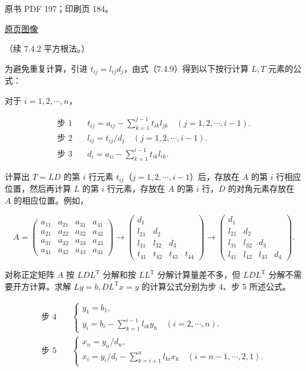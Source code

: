 \documentclass[
  10pt,
  fontset=fandol]{ctexart}
\begin{document}
\clearpage

原书 PDF 197；印刷页 184。

\href{../../../source-images/pdf-197.jpeg}{原页图像}

（续 7.4.2 平方根法。）

为避免重复计算，引进 \(t_{ij}=l_{ij}d_j\)，由式（7.4.9）得到以下按行计算
\(L,T\) 元素的公式：

对于 \(i=1,2,\cdots,n\)，

\[
\begin{aligned}
\text{步 1}\quad &t_{ij}=a_{ij}-\sum_{k=1}^{j-1}t_{ik}l_{jk}\quad(j=1,2,\cdots,i-1).\\
\text{步 2}\quad &l_{ij}=t_{ij}/d_j\quad(j=1,2,\cdots,i-1).\\
\text{步 3}\quad &d_i=a_{ii}-\sum_{k=1}^{i-1}t_{ik}l_{ik}.
\end{aligned}
\tag{7.4.10}
\]

计算出 \(T=LD\) 的第 \(i\) 行元素
\(t_{ij}\)（\(j=1,2,\cdots,i-1\)）后，存放在 \(A\) 的第 \(i\)
行相应位置，然后再计算 \(L\) 的第 \(i\) 行元素，存放在 \(A\) 的第 \(i\)
行，\(D\) 的对角元素存放在 \(A\) 的相应位置。例如，

\[
A=\begin{pmatrix}
a_{11}&a_{21}&a_{31}&a_{41}\\
a_{21}&a_{22}&a_{32}&a_{42}\\
a_{31}&a_{32}&a_{33}&a_{43}\\
a_{41}&a_{42}&a_{43}&a_{44}
\end{pmatrix}
\longrightarrow
\begin{pmatrix}
d_1&&&\\
l_{21}&d_2&&\\
l_{31}&l_{32}&d_3&\\
t_{41}&t_{42}&t_{43}&t_{44}
\end{pmatrix}
\longrightarrow
\begin{pmatrix}
d_1&&&\\
l_{21}&d_2&&\\
l_{31}&l_{32}&d_3&\\
l_{41}&l_{42}&l_{43}&d_4
\end{pmatrix}.
\]

对称正定矩阵 \(A\) 按 \(LDL^{\mathrm T}\) 分解和按 \(LL^{\mathrm T}\)
分解计算量差不多，但 \(LDL^{\mathrm T}\) 分解不需要开方计算。求解
\(Ly=b,DL^{\mathrm T}x=y\) 的计算公式分别为步 4、步 5 所述公式。

\[
\begin{aligned}
\text{步 4}\quad &\begin{cases}
y_1=b_1,\\
y_i=b_i-\displaystyle\sum_{k=1}^{i-1}l_{ik}y_h\quad(i=2,\cdots,n).
\end{cases}\\
\text{步 5}\quad &\begin{cases}
x_n=y_n/d_n,\\
x_i=y_i/d_i-\displaystyle\sum_{k=i+1}^{n}l_{ki}x_k\quad(i=n-1,\cdots,2,1).
\end{cases}
\end{aligned}
\tag{7.4.11}
\]
\end{document}
